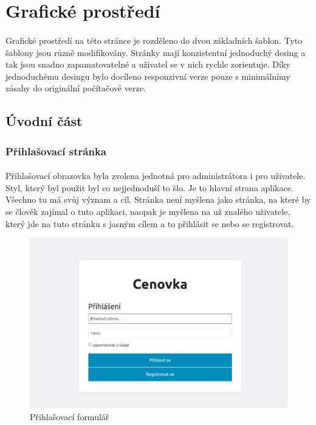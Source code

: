 \section{Grafické prostředí}
\paragraph{}
Grafické prostředí na této stránce je rozděleno do dvou základních šablon. Tyto šablony jsou různě modifikovány. Stránky mají konzistentní jednoduchý desing a tak jsou snadno zapamatovatelné a uživatel se v nich rychle zorientuje. Díky jednoduchému desingu bylo docíleno responzivní verze pouze s minimálnímy zásahy do originální počítačové verze. 
\subsection{Úvodní část}
\subsubsection{Přihlašovací stránka}
\paragraph{} 
Přihlašovací obrazovka byla zvolena jednotná pro administrátora i pro uživatele. Styl, který byl použit byl co nejjednoduší to šlo. Je to hlavní strana aplikace. Všechno tu má svůj význam a cíl. Stránka není myšlena jako stránka, na které by se člověk zajímal o tuto aplikaci, naopak je myšlena na už znalého uživatele, který jde na tuto stránku s jasným cílem a to přihlásit se nebo se registrovat. 
\begin{figure}[h]
\centering
\includegraphics[width=1\textwidth]{graphic/login.png}
\caption{Přihlašovací formulář}
\end{figure}
